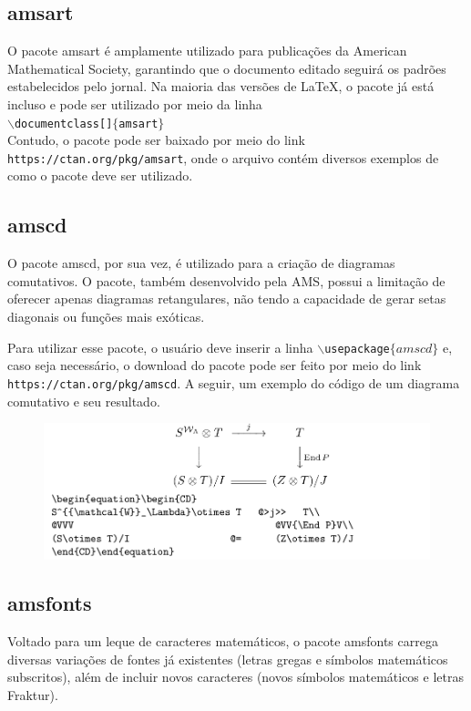 \documentclass[12pt]{article}
\begin{document}
		
		\subsection{amsart}
			O pacote amsart é amplamente utilizado para publicações da American Mathematical Society, garantindo que o documento editado seguirá os padrões estabelecidos pelo jornal. Na maioria das versões de LaTeX, o pacote já está incluso e pode ser utilizado por meio da linha\\
			\texttt{$\backslash$documentclass[]$\{$amsart$\}$}\\
			Contudo, o pacote pode ser baixado por meio do link \texttt{https://ctan.org/pkg/amsart}, onde o arquivo contém diversos exemplos de como o pacote deve ser utilizado.
		
		\subsection{amscd}
			O pacote amscd, por sua vez, é utilizado para a criação de diagramas comutativos. O pacote, também desenvolvido pela AMS, possui a limitação de oferecer apenas diagramas retangulares, não tendo a capacidade de gerar setas diagonais ou funções mais exóticas.
			
			Para utilizar esse pacote, o usuário deve inserir a linha \texttt{$\backslash$usepackage$\{amscd\}$} e, caso seja necessário, o download do pacote pode ser feito por meio do link \texttt{https://ctan.org/pkg/amscd}. A seguir, um exemplo do código de um diagrama comutativo e seu resultado.
			
			\begin{figure}[h]
				\begin{center}
					\includegraphics[scale=0.4]{amscd.png}
				\end{center}
			\end{figure}
			\newpage
			
		
		\subsection{amsfonts}
			Voltado para um leque de caracteres matemáticos, o pacote amsfonts carrega diversas variações de fontes já existentes (letras gregas e símbolos matemáticos subscritos), além de incluir novos caracteres (novos símbolos matemáticos e letras Fraktur).
			
\end{document}
